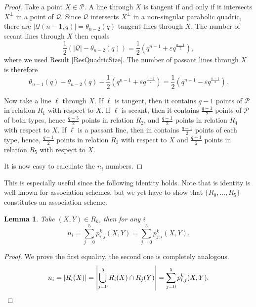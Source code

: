 \documentclass[a4paper]{article}
\newtheorem{lm}[thm]{Lemma}
\theoremstyle{definition}
\newcommand{\eps}{\varepsilon}
\newcommand{\pp}{\mathcal P}
\newcommand{\mq}{\mathcal Q}
\newcommand{\sam}[1]{\textcolor{purple}{#1}}
\newcommand{\maarten}[1]{\textcolor{orange}{#1}}
\begin{document}
\begin{proof}
 Take a point $X \in \pp$.
 A line through $X$ is tangent if and only if it intersects $X^\perp$ in a point of $\mq$.
 Since $\mq$ intersects $X^\perp$ in a non-singular parabolic quadric, there are $|\mq(n-1,q)| = \theta_{n-2}(q)$ tangent lines through $X$.
 The number of secant lines through $X$ then equals
 \[
  \frac 12 \left(|\mq| - \theta_{n-2}(q)\right) = \frac 12 \left(q^{n-1} + \eps q^{\frac{n-1}2}\right),
 \]
 where we used Result \ref{ResQuadricSize}.
 The number of passant lines through $X$ is therefore
 \[
  \theta_{n-1}(q) - \theta_{n-2}(q) - \frac 12 \left(q^{n-1} + \eps q^{\frac{n-1}2} \right)
  = \frac 12 \left(q^{n-1} - \eps q^{\frac{n-1}2} \right).
 \]
 
 Now take a line $\ell$ through $X$.
 If $\ell$ is tangent, then it contains $q-1$ points of $\pp$ in relation $R_1$ with respect to $X$.
 If $\ell$ is secant, then it contains $\frac{q-1}2$ points of $\pp$ of both types, hence $\frac{q-3}2$ points in relation $R_2$, and $\frac{q-1}2$ points in relation $R_4$ with respect to $X$.
 If $\ell$ is a passant line, then in contains $\frac{q+1}2$ points of each type, hence, $\frac{q-1}2$ points in relation $R_3$ with respect to $X$ and $\frac{q+1}2$ points in relation $R_5$ with respect to $X$.
 
 It is now easy to calculate the $n_i$ numbers.
\end{proof}

This is especially useful since the following identity holds. Note that is identity is well-known for association schemes, but we yet have to show that $\{R_0,\dots,R_5\}$ constitutes an association scheme.

\begin{lm}
 \label{LmSumValency}
 Take $(X,Y) \in R_k$, then for any $i$
 \[
  n_i = \sum_{j=0}^5 p_{i,j}^k(X,Y) = \sum_{j=0}^5 p_{j,i}^k(X,Y).
 \]
\end{lm}
\begin{proof}
 We prove the first equality, the second one is completely analogous.
 \[
  n_i = |R_i(X)|
  = \left| \bigcup_{j=0}^5 R_i(X) \cap R_j(Y) \right|
  = \sum_{j=0}^5 p_{i,j}^k (X,Y).
  \qedhere
 \]
\end{proof}
\end{document}

